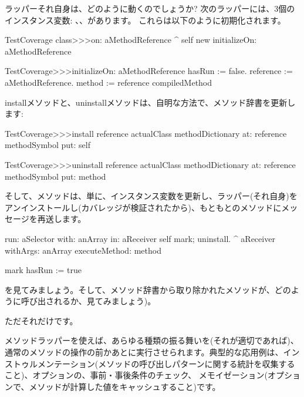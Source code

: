 \documentclass[a4paper,10pt,twoside]{book}
\begin{document}
ラッパーそれ自身は、どのように動くのでしょうか?
次のラッパーには、3個のインスタンス変数: 、、があります。
これらは以下のように初期化されます。
\begin{code}{}
TestCoverage class>>>on: aMethodReference
	^ self new initializeOn: aMethodReference

TestCoverage>>>initializeOn: aMethodReference
	hasRun := false.
	reference := aMethodReference.
	method := reference compiledMethod
\end{code}

installメソッドと、uninstallメソッドは、自明な方法で、メソッド辞書を更新します:
\begin{code}{}
TestCoverage>>>install
	reference actualClass methodDictionary
		at: reference methodSymbol
		put: self

TestCoverage>>>uninstall
	reference actualClass methodDictionary
		at: reference methodSymbol
		put: method
\end{code}
\noindent
そして、メソッドは、単に、インスタンス変数を更新し、ラッパー(それ自身)をアンインストールし(カバレッジが検証されたから)、もともとのメソッドにメッセージを再送します。%
\begin{code}{}
run: aSelector with: anArray in: aReceiver
	self mark; uninstall.
	^ aReceiver withArgs: anArray executeMethod: method

mark
	hasRun := true
\end{code}
を見てみましょう。そして、メソッド辞書から取り除かれたメソッドが、どのように呼び出されるか、見てみましょう)。

ただそれだけです。

メソッドラッパーを使えば、あらゆる種類の振る舞いを(それが適切であれば)、通常のメソッドの操作の前かあとに実行させられます。典型的な応用例は、インストゥルメンテーション(メソッドの呼び出しパターンに関する統計を収集すること)、オプションの、事前・事後条件のチェック、 メモイゼーション(オプションで、メソッドが計算した値をキャッシュすること)です。
\end{document}

